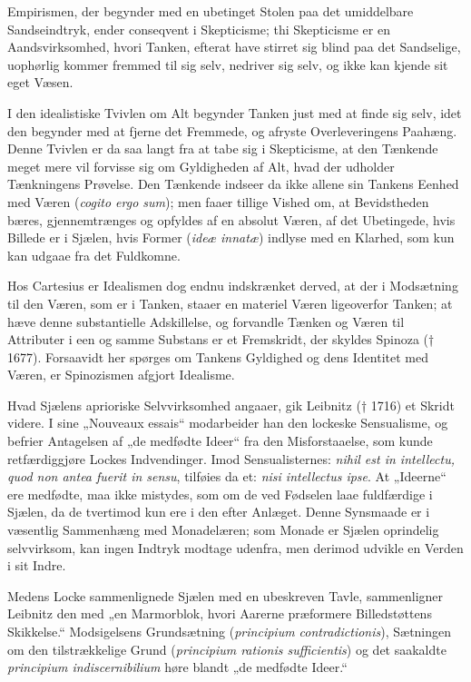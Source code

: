 \documentclass[12pt]{book}
\newcommand{\opage}[1]{\marginnote{\footnotesize\textit{[#1]}}}
\begin{document}
Empirismen, der begynder med en ubetinget Stolen paa det umiddelbare Sandseindtryk,
ender conseqvent i Skepticisme; thi Skepticisme er en Aandsvirksomhed, hvori Tanken,
efterat have stirret sig blind paa det Sandselige, uophørlig kommer fremmed til sig
selv, nedriver sig selv, og ikke kan kjende sit eget Væsen.

I den idealistiske Tvivlen om Alt begynder Tanken just med at finde sig selv, idet
den begynder med at fjerne det Fremmede, og afryste Overleveringens Paahæng. Denne
Tvivlen er da saa langt fra at tabe sig i Skepticisme, at den Tænkende meget mere
vil forvisse sig om Gyldigheden af Alt, hvad der udholder Tænkningens Prøvelse.
\opage{19} Den Tænkende indseer da ikke allene sin Tankens Eenhed med Væren (\textit{cogito
ergo sum}); men faaer tillige Vished om, at Bevidstheden bæres, gjennemtrænges og
opfyldes af en absolut Væren, af det Ubetingede, hvis Billede er i Sjælen, hvis
Former (\textit{ideæ innatæ}) indlyse med en Klarhed, som kun kan udgaae fra det
Fuldkomne.

Hos Cartesius er Idealismen dog endnu indskrænket derved, at der i Modsætning til
den Væren, som er i Tanken, staaer en materiel Væren ligeoverfor Tanken; at hæve
denne substantielle Adskillelse, og forvandle Tænken og Væren til Attributer i een
og samme Substans er et Fremskridt, der skyldes Spinoza († 1677). Forsaavidt her
spørges om Tankens Gyldighed og dens Identitet med Væren, er Spinozismen afgjort
Idealisme.

Hvad Sjælens aprioriske Selvvirksomhed angaaer, gik Leibnitz († 1716) et Skridt
videre. I sine „Nouveaux essais“ modarbeider han den lockeske Sensualisme, og
befrier Antagelsen af „de medfødte Ideer“ fra den Misforstaaelse, som kunde
retfærdiggjøre Lockes Indvendinger. Imod Sensualisternes: \textit{nihil est in
intellectu, quod non antea fuerit in sensu}, tilføies da et: \textit{nisi
intellectus ipse}. At „Ideerne“ ere medfødte, maa ikke mistydes, som om de ved
Fødselen laae fuldfærdige i Sjælen, da de tvertimod kun ere i den efter Anlæget.
Denne Synsmaade er i væsentlig Sammenhæng med Monadelæren; som Monade er Sjælen
oprindelig selvvirksom, kan ingen Indtryk modtage udenfra, men derimod udvikle en
Verden i sit Indre.

Medens Locke sammenlignede Sjælen med en ubeskreven Tavle, sammenligner Leibnitz
den med „en Marmorblok, hvori Aarerne præformere Billedstøttens Skikkelse.“
Modsigelsens Grundsætning (\textit{principium contradictionis}), Sætningen om den
tilstrækkelige Grund (\textit{principium rationis sufficientis}) og det saakaldte
\textit{principium indiscernibilium} høre blandt „de medfødte Ideer.“
\end{document}
